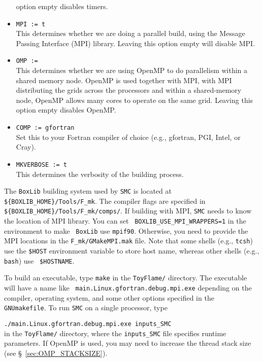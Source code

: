 \documentclass[11pt,letterpaper]{article}
\begin{document}
\begin{itemize}
  option empty disables timers.
\item {\tt MPI := t}\\
  This determines whether we are doing a parallel build, using the
  Message Passing Interface (MPI) library. Leaving this
  option empty will disable MPI.
\item {\tt OMP :=}\\
  This determines whether we are using OpenMP to do parallelism within
  a shared memory node. OpenMP is used together with MPI, with MPI
  distributing the grids across the processors and within a
  shared-memory node, OpenMP allows many cores to operate on the same
  grid.  Leaving this option empty disables OpenMP.
\item {\tt COMP := gfortran}\\
  Set this to your Fortran compiler of choice (e.g., gfortran, PGI,
  Intel, or Cray).
\item {\tt MKVERBOSE := t}\\
  This determines the verbosity of the building process.
\end{itemize}

The {\tt BoxLib} building system used by {\tt SMC} is located at {\tt
  \$\{BOXLIB\_HOME\}/Tools/F\_mk}.  The compiler flags are specified
in {\tt \$\{BOXLIB\_HOME\}/Tools/F\_mk/comps/}.  If building with MPI,
{\tt SMC} needs to know the location of MPI library.  You can set {\tt
  BOXLIB\_USE\_MPI\_WRAPPERS=1} in the environment to make {\tt
  BoxLib} use {\tt mpif90}.  Otherwise, you need to provide the MPI
locations in the {\tt F\_mk/GMakeMPI.mak} file.  Note that some shells
(e.g., {\tt tcsh}) use the {\tt \$HOST} environment variable to store
host name, whereas other shells (e.g., {\tt bash}) use {\tt
  \$HOSTNAME}.

To build an executable, type {\tt make} in the {\tt ToyFlame/}
directory.  The executable will have a name like {\tt
  main.Linux.gfortran.debug.mpi.exe} depending on the compiler,
operating system, and some other options specified in the {\tt
  GNUmakefile}.  To run {\tt SMC} on a single processor, type
\vspace{5pt}

\verb|./main.Linux.gfortran.debug.mpi.exe inputs_SMC|\vspace{5pt}\\
in the {\tt ToyFlame/} directory, where the {\tt inputs\_SMC} file
specifies runtime parameters.  If OpenMP is used, you may need to
increase the thread stack size (see \S~\ref{sec:OMP_STACKSIZE}).
\end{document}
